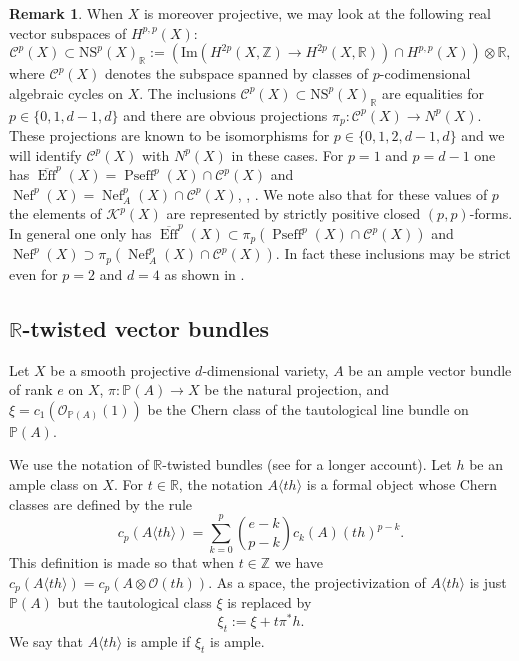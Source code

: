 \documentclass[a4,reqno]{amsart}
\theoremstyle{definition}
\newtheorem{remark}[theorem]{Remark}
\def\cC{\mathcal C }
\def\cO{\mathcal O}
\def\cK{\mathcal K}
\renewcommand{\P}{\mathbb{P}}
\newcommand{\R}{\mathbb{R}}
\newcommand{\Z}{\mathbb{Z}}
\DeclareMathOperator{\Eff}{Eff}
\def\im{\mbox{Im}}
\def\NS{\mbox{NS}}
\DeclareMathOperator{\Pseff}{Pseff}
\DeclareMathOperator{\Nef}{Nef}
\numberwithin{equation}{section}
\begin{document}
\begin{remark}\label{rem:cones}
    When $X$ is moreover projective, we may look at the following real vector subspaces of $H^{p,p}(X)$:
    $$\cC^p(X)\subset \NS^p(X)_\R:=(\im(H^{2p}(X,\Z)\to H^{2p}(X,\R))\cap H^{p,p}(X))\otimes\R,$$
    where $\cC^p(X)$ denotes the subspace spanned by classes of $p$-codimensional algebraic cycles on $X$. The inclusions $\cC^p(X)\subset \NS^p(X)_\R$ are equalities for $p\in\{0,1,d-1,d\}$ and there are obvious projections $\pi_p:\cC^p(X)\to N^p(X)$. These projections are known to be isomorphisms for $p\in\{0,1,2,d-1,d\}$ and we will identify $\cC^p(X)$ with $N^p(X)$ in these cases.  For  $p=1$ and $p=d-1$ one has $\overline{\Eff}^p(X)=\Pseff^p(X)\cap\cC^p(X)$ and $\Nef^p(X)=\Nef^p_A(X)\cap \cC^p(X)$, \cite[Proposition 6.1]{Demailly-regularization}, \cite{Witt}. We note also that for these values of $p$ the elements of $\cK^p(X)$ are represented by strictly positive closed $(p,p)$-forms. In general one only has $\overline{\Eff}^p(X)\subset\pi_p(\Pseff^p(X)\cap\cC^p(X))$ and $\Nef^p(X)\supset\pi_p(\Nef^p_A(X)\cap\cC^p(X)).$ In fact these inclusions may be strict even for $p=2$ and $d=4$ as shown in \cite[Theorem B]{DELV11}. 
\end{remark}
\subsection{$\mathbb R$-twisted vector bundles}

Let $X$ be a smooth projective $d$-dimensional variety, $A$ be an ample vector bundle of rank $e$ on $X$, $\pi : \P(A) \to X$ be the natural projection, and $\xi = c_1(\cO_{\P(A)}(1))$ be the Chern class of the tautological line bundle on $\P(A)$.   

We use the notation of $\mathbb R$-twisted bundles (see \cite[Sec. 2.4]{RossToma1} for a longer account).  Let $h$ be an ample class on $X$.   For $t\in \mathbb R$, the notation $A\langle th\rangle$ is a formal object whose Chern classes are defined by the rule
$$c_p(A\langle th\rangle) = \sum_{k=0}^p \binom{e-k}{p-k} c_k(A) (th)^{p-k}.$$
This definition is made so that when $t\in \mathbb Z$ we have $c_p(A\langle th\rangle) = c_p(A\otimes \mathcal O(th))$.   As a space, the projectivization of $A\langle th\rangle$ is just $\mathbb P(A)$ but the tautological class $\xi$ is replaced by
$$\xi_t := \xi + t \pi^* h.$$
We say that $A\langle th\rangle$ is ample if $\xi_t$ is ample. 
\end{document}
